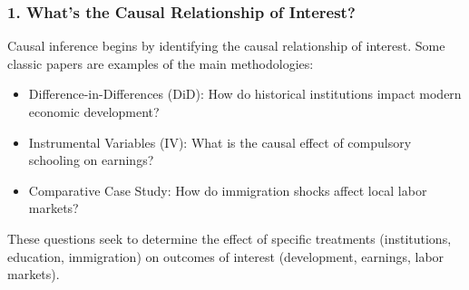 \documentclass[xcolor=svgnames,t]{beamer}
\begin{document}
\begin{frame}
    \frametitle{1. What's the Causal Relationship of Interest?}

    Causal inference begins by identifying the causal relationship of interest. Some classic papers are examples of the main methodologies:
    \begin{itemize}
        \item Difference-in-Differences (DiD): How do historical institutions impact modern economic development? \cite{acemoglu2001}
        
        \pause
        \item Instrumental Variables (IV): What is the causal effect of compulsory schooling on earnings? \cite{angrist1991education}
        
        \pause
        \item Comparative Case Study: How do immigration shocks affect local labor markets? \cite{card1990mariel}
    \end{itemize}

    These questions seek to determine the effect of specific treatments (institutions, education, immigration) on outcomes of interest (development, earnings, labor markets).
\end{frame}
\end{document}
